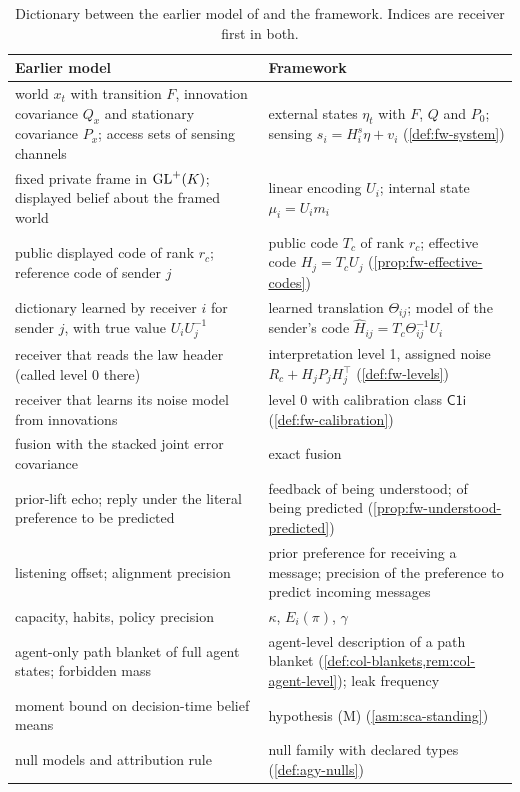 \begin{table}[t]
\centering\small
\caption{Dictionary between the earlier model of \citet{dennis2026communicating} and the framework. Indices are receiver first in both.}\label{tab:min-dictionary}
\begin{tabular}{@{}>{\raggedright\arraybackslash}p{}>{\raggedright\arraybackslash}p{}@{}}
\toprule
Earlier model & Framework \\
\midrule
world $x_t$ with transition $F$, innovation covariance $Q_x$ and stationary covariance $P_x$; access sets of sensing channels & external states $\eta_t$ with $F$, $Q$ and $P_0$; sensing $s_i=H^s_i\eta+v_i$ (\cref{def:fw-system}) \\
fixed private frame in $\mathrm{GL}^+(K)$; displayed belief about the framed world & linear encoding $U_i$; internal state $\mu_i=U_im_i$ \\
public displayed code of rank $r_c$; reference code of sender $j$ & public code $T_c$ of rank $r_c$; effective code $H_j=T_cU_j$ (\cref{prop:fw-effective-codes}) \\
dictionary learned by receiver $i$ for sender $j$, with true value $U_iU_j^{-1}$ & learned translation $\Theta_{ij}$; model of the sender's code $\hat H_{ij}=T_c\Theta_{ij}^{-1}U_i$ \\
receiver that reads the law header (called level 0 there) & interpretation level 1, assigned noise $R_c+H_jP_jH_j^\top$ (\cref{def:fw-levels}) \\
receiver that learns its noise model from innovations & level 0 with calibration class $\mathsf{C1i}$ (\cref{def:fw-calibration}) \\
fusion with the stacked joint error covariance & exact fusion \\
prior-lift echo; reply under the literal preference to be predicted & feedback of being understood; of being predicted (\cref{prop:fw-understood-predicted}) \\
listening offset; alignment precision & prior preference for receiving a message; precision of the preference to predict incoming messages \\
capacity, habits, policy precision & $\kappa$, $E_i(\pi)$, $\gamma$ \\
agent-only path blanket of full agent states; forbidden mass & agent-level description of a path blanket (\cref{def:col-blankets,rem:col-agent-level}); leak frequency \\
moment bound on decision-time belief means & hypothesis (M) (\cref{asm:sca-standing}) \\
null models and attribution rule & null family with declared types (\cref{def:agy-nulls}) \\
\bottomrule
\end{tabular}
\end{table}

